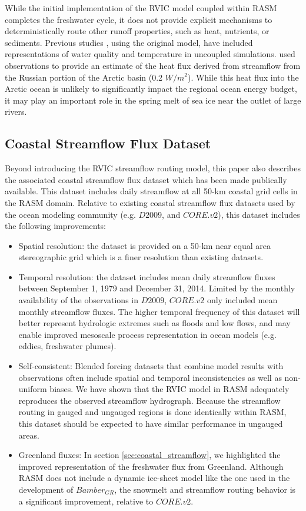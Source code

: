 While the initial implementation of the RVIC model coupled within RASM completes the freshwater cycle, it does not provide explicit mechanisms to deterministically route other runoff properties, such as heat, nutrients, or sediments.
Previous studies \citep[e.g.][]{vanVliet_2011,vanVliet_2012}, using the original \citet{Lohmann_1996} model, have included representations of water quality and temperature in uncoupled simulations.
\citet{Lammers_2007} used observations to provide an estimate of the heat flux derived from streamflow from the Russian portion of the Arctic basin (0.2 $W/m^2$).
While this heat flux into the Arctic ocean is unlikely to significantly impact the regional ocean energy budget, it may play an important role in the spring melt of sea ice near the outlet of large rivers.

\subsection{Coastal Streamflow Flux Dataset}
Beyond introducing the RVIC streamflow routing model, this paper also describes the associated coastal streamflow flux dataset which has been made publically available.
This dataset includes daily streamflow at all 50-km coastal grid cells in the RASM domain.
Relative to existing coastal streamflow flux datasets used by the ocean modeling community (e.g. $D2009$, and $CORE.v2$), this dataset includes the following improvements:

\begin{itemize}
  \item Spatial resolution: the dataset is provided on a 50-km near equal area stereographic grid which is a finer resolution than existing datasets.
  \item Temporal resolution: the dataset includes mean daily streamflow fluxes between September 1, 1979 and December 31, 2014. Limited by the monthly availability of the observations in $D2009$, $CORE.v2$ only included mean monthly streamflow fluxes.
  The higher temporal frequency of this dataset will better represent hydrologic extremes such as floods and low flows, and may enable improved mesoscale process representation in ocean models (e.g. eddies, freshwater plumes).
  \item Self-consistent: Blended forcing datasets that combine model results with observations often include spatial and temporal inconsistencies as well as non-uniform biases. We have shown that the RVIC model in RASM adequately reproduces the observed streamflow hydrograph. Because the streamflow routing in gauged and ungauged regions is done identically within RASM, this dataset should be expected to have similar performance in ungauged areas.
  \item Greenland fluxes: In section \ref{sec:coastal_streamflow}, we highlighted the improved representation of the freshwater flux from Greenland. Although RASM does not include a dynamic ice-sheet model like the one used in the development of $Bamber_{GR}$, the snowmelt and streamflow routing behavior is a significant improvement, relative to $CORE.v2$.
\end{itemize}

